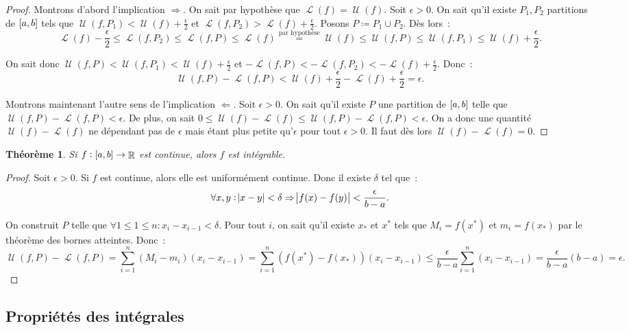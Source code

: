 \documentclass{article}
\DeclareMathOperator{\R}{\mathbb R}
\DeclareMathOperator{\Larea}{\mathcal L}
\DeclareMathOperator{\Uarea}{\mathcal U}
\newcommand{\ab}{\interval ab}
\newcommand{\fabr}[1]{#1 : \ab \to \R}
\newtheorem{thm}{Théorème}[section]
\theoremstyle{definition}
\theoremstyle{remark}
\begin{document}
		\begin{proof} Montrons d'abord l'implication $\Rightarrow$. On sait par hypothèse que $\Larea(f) = \Uarea(f)$. Soit $\epsilon > 0$. On sait
		qu'il existe $P_1, P_2$ partitions de $\ab$ tels que $\Uarea(f, P_1) < \Uarea(f)+\frac \epsilon2$ et $\Larea(f, P_2) > \Larea(f) + \frac \epsilon2$.
		Posons $P \coloneqq P_1 \cup P_2$. Dès lors~:
		\[
			\Larea(f) - \frac \epsilon2 \leq \Larea(f, P_2) \leq \Larea(f, P) \leq \Larea(f)
			  \stackrel{\text{par hypothèse}}=
			\Uarea(f) \leq \Uarea(f, P) \leq \Uarea(f, P_1) \leq \Uarea(f) + \frac \epsilon2.
		\]

		On sait donc $\Uarea(f, P) < \Uarea(f, P_1) < \Uarea(f)+\frac \epsilon2$ et $-\Larea(f, P) < -\Larea(f, P_2) < -\Larea(f)+\frac \epsilon2$. Donc~:
		\[\Uarea(f, P) - \Larea(f, P) < \Uarea(f)+\frac \epsilon2-\Larea(f)+\frac \epsilon2 = \epsilon.\]

		Montrons maintenant l'autre sens de l'implication $\Leftarrow$. Soit $\epsilon > 0$. On sait qu'il existe $P$ une partition de $\ab$ telle que
		$\Uarea(f, P) - \Larea(f, P) < \epsilon$. De plus, on sait $0 \leq \Uarea(f)-\Larea(f) \leq \Uarea(f, P)-\Larea(f, P) < \epsilon$. On a donc une
		quantité $\Uarea(f)-\Larea(f)$ ne dépendant pas de $\epsilon$ mais étant plus petite qu'$\epsilon$ pour tout $\epsilon > 0$. Il faut dès lors
		$\Uarea(f)-\Larea(f) = 0$. \end{proof}

		\begin{thm} Si $\fabr f$ est continue, alors $f$ est intégrable. \end{thm}

		\begin{proof} Soit $\epsilon > 0$. Si $f$ est continue, alors elle est uniformément continue. Donc il existe $\delta$ tel que~:
		\[\forall x, y : \abs{x-y} < \delta \Rightarrow \abs{f(x)-f(y)} < \frac \epsilon{b-a}.\]

		On construit $P$ telle que $\forall 1 \leq 1 \leq n : x_i-x_{i-1} < \delta$. Pour tout $i$, on sait qu'il existe $x_*$ et $x^*$ tels que
		$M_i = f(x^*)$ et $m_i = f(x_*)$ par le théorème des bornes atteintes. Donc~:
		\[\Uarea(f, P)-\Larea(f, P) = \sum_{i=1}^n(M_i-m_i)(x_i-x_{i-1}) = \sum_{i=1}^n(f(x^*)-f(x_*))(x_i-x_{i-1}) \leq \frac \epsilon{b-a}\sum_{i=1}^n(x_i-x_{i-1})
		= \frac \epsilon{b-a}(b-a) = \epsilon.\]
		\end{proof}

	\subsection{Propriétés des intégrales}
\end{document}
